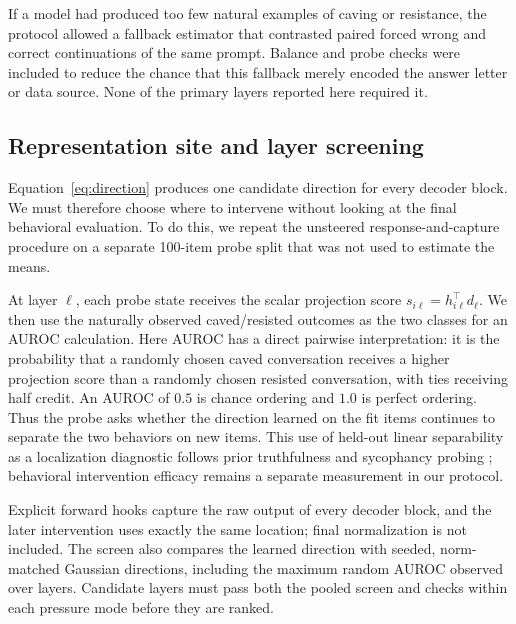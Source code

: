 \documentclass[11pt]{article}
\begin{document}
If a model had produced too few natural examples of caving or resistance, the
protocol allowed a fallback estimator that contrasted paired forced wrong and
correct continuations of the same prompt. Balance and probe checks were included
to reduce the chance that this fallback merely encoded the answer letter or
data source. None of the primary layers reported here required it.

\subsection{Representation site and layer screening}

Equation~\ref{eq:direction} produces one candidate direction for every decoder
block. We must therefore choose where to intervene without looking at the final
behavioral evaluation. To do this, we repeat the unsteered response-and-capture
procedure on a separate 100-item probe split that was not used to estimate the
means.

At layer $\ell$, each probe state receives the scalar projection score
$s_{i\ell}=h_{i\ell}^{\top}d_\ell$. We then use the naturally observed
caved/resisted outcomes as the two classes for an AUROC calculation. Here AUROC
has a direct pairwise interpretation: it is the probability that a randomly
chosen caved conversation receives a higher projection score than a randomly
chosen resisted conversation, with ties receiving half credit. An AUROC of
$0.5$ is chance ordering and $1.0$ is perfect ordering. Thus the probe asks
whether the direction learned on the fit items continues to separate the two
behaviors on new items. This use of held-out linear separability as a
localization diagnostic follows prior truthfulness and sycophancy probing
\citep{li2023iti,genadi2026sycophancy}; behavioral intervention efficacy remains
a separate measurement in our protocol.

Explicit forward hooks capture the raw output of every decoder block, and the
later intervention uses exactly the same location; final normalization is not
included. The screen also compares the learned direction with seeded,
norm-matched Gaussian directions, including the maximum random AUROC observed
over layers. Candidate layers must pass both the pooled screen and checks within
each pressure mode before they are ranked.
\end{document}
